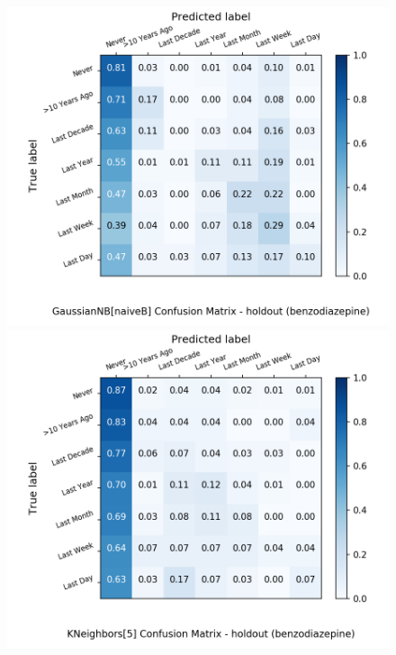 \begin{figure}[H]
	\begin{minipage}[b]{0.32\textwidth}
		\includegraphics[width=1.1\textwidth]{Plots/benzodiazepine_GaussianNB_naiveB_balance_False_holdout.png}
	\end{minipage}
	\begin{minipage}[b]{0.32\textwidth}
		\includegraphics[width=1.1\textwidth]{Plots/benzodiazepine_KNeighbors_5_balance_False_holdout.png}
  \end{minipage}
	\begin{minipage}[b]{0.32\textwidth}

\end{minipage}
\end{figure}
